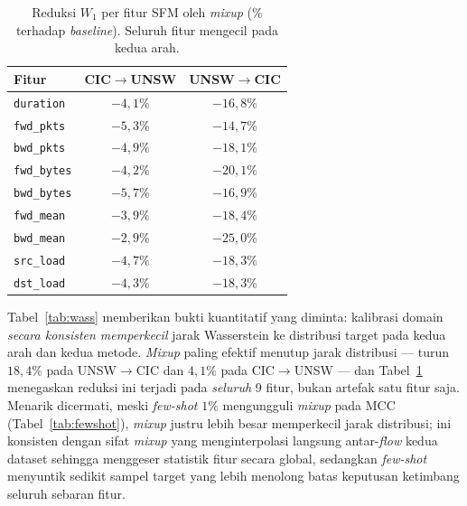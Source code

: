 \documentclass[11pt,a4paper]{article}
\begin{document}
\begin{table}[h]
\centering
\caption{Reduksi $W_1$ per fitur SFM oleh \emph{mixup} (\% terhadap
\emph{baseline}). Seluruh fitur mengecil pada kedua arah.}
\label{tab:wassfeat}
\begin{tabular}{lcc}
\toprule
Fitur & CIC$\rightarrow$UNSW & UNSW$\rightarrow$CIC \\
\midrule
\texttt{duration}  & $-4{,}1\%$ & $-16{,}8\%$ \\
\texttt{fwd\_pkts}  & $-5{,}3\%$ & $-14{,}7\%$ \\
\texttt{bwd\_pkts}  & $-4{,}9\%$ & $-18{,}1\%$ \\
\texttt{fwd\_bytes} & $-4{,}2\%$ & $-20{,}1\%$ \\
\texttt{bwd\_bytes} & $-5{,}7\%$ & $-16{,}9\%$ \\
\texttt{fwd\_mean}  & $-3{,}9\%$ & $-18{,}4\%$ \\
\texttt{bwd\_mean}  & $-2{,}9\%$ & $-25{,}0\%$ \\
\texttt{src\_load}  & $-4{,}7\%$ & $-18{,}3\%$ \\
\texttt{dst\_load}  & $-4{,}3\%$ & $-18{,}3\%$ \\
\bottomrule
\end{tabular}
\end{table}

Tabel~\ref{tab:wass} memberikan bukti kuantitatif yang diminta: kalibrasi domain
\emph{secara konsisten memperkecil} jarak Wasserstein ke distribusi target pada
kedua arah dan kedua metode. \emph{Mixup} paling efektif menutup jarak
distribusi --- turun $18{,}4\%$ pada UNSW$\rightarrow$CIC dan $4{,}1\%$ pada
CIC$\rightarrow$UNSW --- dan Tabel~\ref{tab:wassfeat} menegaskan reduksi ini
terjadi pada \emph{seluruh} 9 fitur, bukan artefak satu fitur saja. Menarik
dicermati, meski \emph{few-shot} $1\%$ mengungguli \emph{mixup} pada MCC
(Tabel~\ref{tab:fewshot}), \emph{mixup} justru lebih besar memperkecil jarak
distribusi; ini konsisten dengan sifat \emph{mixup} yang menginterpolasi
langsung antar-\emph{flow} kedua dataset sehingga menggeser statistik fitur
secara global, sedangkan \emph{few-shot} menyuntik sedikit sampel target yang
lebih menolong batas keputusan ketimbang seluruh sebaran fitur.
\end{document}
